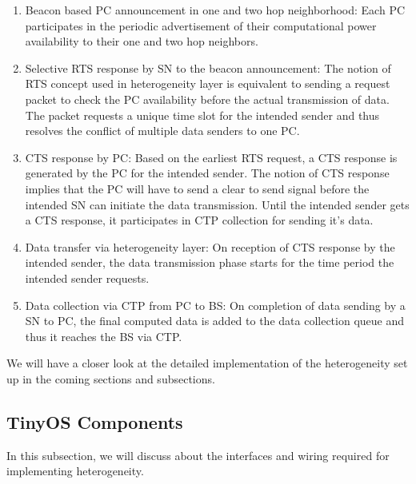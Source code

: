     \begin{enumerate}
        \item Beacon based \ac{PC} announcement in one and two hop neighborhood: Each \ac{PC} participates in the periodic advertisement of their computational power availability to their one and two hop neighbors.
            
        \item Selective \ac{RTS} response by \ac{SN} to the beacon announcement: The notion of \ac{RTS} concept used in heterogeneity layer is equivalent to sending a request packet to check the \ac{PC} availability before the actual transmission of data. The packet requests a unique time slot for the intended sender and thus resolves the conflict of multiple data senders to one \ac{PC}.
        
        \item \ac{CTS} response by \ac{PC}: Based on the earliest \ac{RTS} request, a \ac{CTS} response is generated by the \ac{PC} for the intended sender. The notion of \ac{CTS} response implies that the \ac{PC} will have to send a clear to send signal before the intended \ac{SN} can initiate the data transmission. Until the intended sender gets a \ac{CTS} response, it participates in \ac{CTP} collection for sending it's data.
        
        \item Data transfer via heterogeneity layer: On reception of \ac{CTS} response by the intended sender, the data transmission phase starts for the time period the intended sender requests. 
        
        \item Data collection via \ac{CTP} from \ac{PC} to \ac{BS}: On completion of data sending by a \ac{SN} to \ac{PC}, the final computed data is added to the data collection queue and thus it reaches the \ac{BS} via \ac{CTP}.
    \end{enumerate}
    
    We will have a closer look at the detailed implementation of the heterogeneity set up in the coming sections and subsections. 
    
    \subsection{TinyOS Components}{\label{subsec:tinyOSComponents}}
    
    In this subsection, we will discuss about the interfaces and wiring required for implementing heterogeneity.
    
